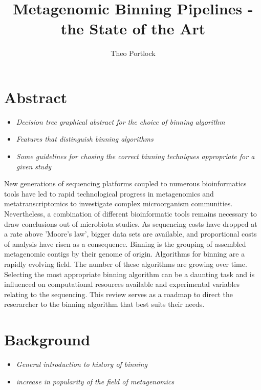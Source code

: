 \documentclass{article}
\title{Metagenomic Binning Pipelines - the State of the Art}
\author{Theo Portlock}
\begin{document}
\maketitle

\section{Abstract}
\begin{itemize}
	\item \emph{Decision tree graphical abstract for the choice of binning algorithm}
	\item \emph{Features that distinguish binning algorithms}
	\item \emph{Some guidelines for chosing the correct binning techniques appropriate for a given study}
\end{itemize}
New generations of sequencing platforms coupled to numerous bioinformatics tools have led to rapid technological progress in metagenomics and metatranscriptomics to investigate complex microorganism communities.
Nevertheless, a combination of different bioinformatic tools remains necessary to draw conclusions out of microbiota studies.
As sequencing costs have dropped at a rate above 'Moore's law', bigger data sets are available, and proportional costs of analysis have risen as a consequence.
Binning is the grouping of assembled metagenomic contigs by their genome of origin.
Algorithms for binning are a rapidly evolving field.
The number of these algorithms are growing over time.
Selecting the most appropriate binning algorithm can be a daunting task and is influenced on computational resources available and experimental variables relating to the sequencing.
This review serves as a roadmap to direct the reserarcher to the binning algorithm that best suits their needs.

\section{Background}
\begin{itemize}
	\item \emph{General introduction to history of binning}
	\item \emph{increase in popularity of the field of metagenomics}
\end{itemize}
\end{document}
